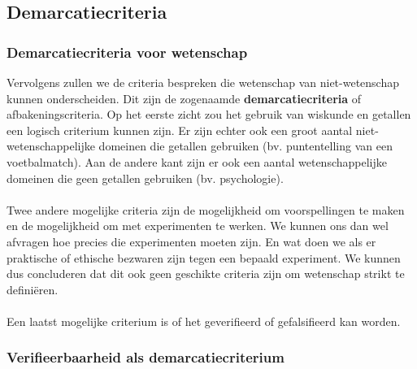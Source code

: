 \documentclass[../summary.tex]{subfiles}
\begin{document}
	\subsection{Demarcatiecriteria}
	
	\subsubsection{Demarcatiecriteria voor wetenschap}
	
	Vervolgens zullen we de criteria bespreken die wetenschap van niet-wetenschap kunnen onderscheiden. Dit zijn de zogenaamde \textbf{demarcatiecriteria} of afbakeningscriteria. Op het eerste zicht zou het gebruik van wiskunde en getallen een logisch criterium kunnen zijn. Er zijn echter ook een groot aantal niet-wetenschappelijke domeinen die getallen gebruiken (bv. puntentelling van een voetbalmatch). Aan de andere kant zijn er ook een aantal wetenschappelijke domeinen die geen getallen gebruiken (bv. psychologie). 
	\\\\
	Twee andere mogelijke criteria zijn de mogelijkheid om voorspellingen te maken en de mogelijkheid om met experimenten te werken. We kunnen ons dan wel afvragen hoe precies die experimenten moeten zijn. En wat doen we als er praktische of ethische bezwaren zijn tegen een bepaald experiment. We kunnen dus concluderen dat dit ook geen geschikte criteria zijn om wetenschap strikt te definiëren. 
	\\\\
	Een laatst mogelijke criterium is of het geverifieerd of gefalsifieerd kan worden. 
	
	\subsubsection{Verifieerbaarheid als demarcatiecriterium}
	
\end{document}
